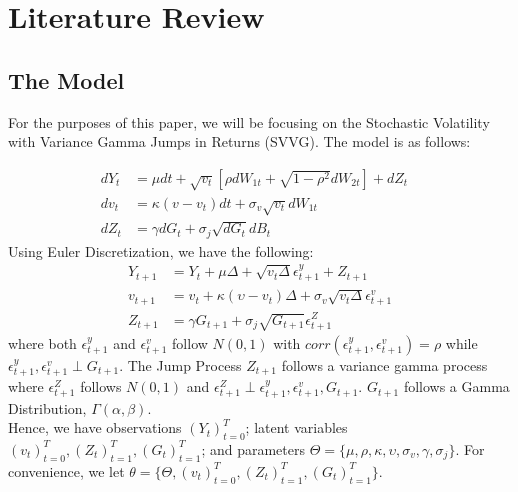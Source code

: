 \documentclass[11pt]{article}
\theoremstyle{definition}
\begin{document}
\section{Literature Review}
\subsection{The Model}
For the purposes of this paper, we will be focusing on the Stochastic Volatility with Variance Gamma Jumps in Returns (SVVG). The model is as follows:

\begin{equation}
	\begin{aligned}
		dY_{t} &=\mu dt+\sqrt{v_{t}}[\rho dW_{1t}+\sqrt{1-\rho ^{2}} dW_{2t}] + dZ_{t} &\\
		dv_{t} &= \kappa (v - v_{t})dt+\sigma _{v}\sqrt{v_{t}}dW_{1t} &\\
		dZ_{t} &= \gamma dG_{t} + \sigma _{j} \sqrt{dG_{t}}dB_{t}
	\end{aligned}
\end{equation}
Using Euler Discretization, we have the following:
\begin{equation}
	\begin{aligned}
		Y_{t+1} &= Y_{t} + \mu\Delta + \sqrt{v_{t}\Delta}\epsilon_{t+1}^{y}+Z_{t+1}\\
		v_{t+1} &= v_{t} + \kappa(\upsilon - v_{t})\Delta + \sigma_{v}\sqrt{v_{t}\Delta}\epsilon_{t+1}^{v}\\
		Z_{t+1} &= \gamma G_{t+1} + \sigma_{j}\sqrt{G_{t+1}}\epsilon_{t+1}^{Z}
	\end{aligned}
\end{equation}
where both $\epsilon_{t+1}^{y}$ and $\epsilon_{t+1}^{v}$ follow $N(0,1)$ with $corr(\epsilon_{t+1}^{y},\epsilon_{t+1}^{v})=\rho$ while $\epsilon_{t+1}^{y},\epsilon_{t+1}^{v} \perp G_{t+1}$. The Jump Process $Z_{t+1}$ follows a variance gamma process where $\epsilon_{t+1}^{Z}$ follows $N(0,1)$ and $\epsilon_{t+1}^{Z} \perp \epsilon_{t+1}^{y},\epsilon_{t+1}^{v},G_{t+1}$. $G_{t+1}$ follows a Gamma Distribution, $\Gamma (\alpha,\beta)$.\\
Hence, we have observations $(Y_{t})_{t=0}^{T}$; latent variables $(v_{t})_{t=0}^{T},(Z_{t})_{t=1}^{T},(G_{t})_{t=1}^{T}$; and parameters $\Theta = \{\mu,\rho,\kappa,\upsilon,\sigma_{v},\gamma,\sigma_{j}\}$. For convenience, we let $\theta = \{\Theta,(v_{t})_{t=0}^{T},(Z_{t})_{t=1}^{T},(G_{t})_{t=1}^{T} \}$.
\end{document}
